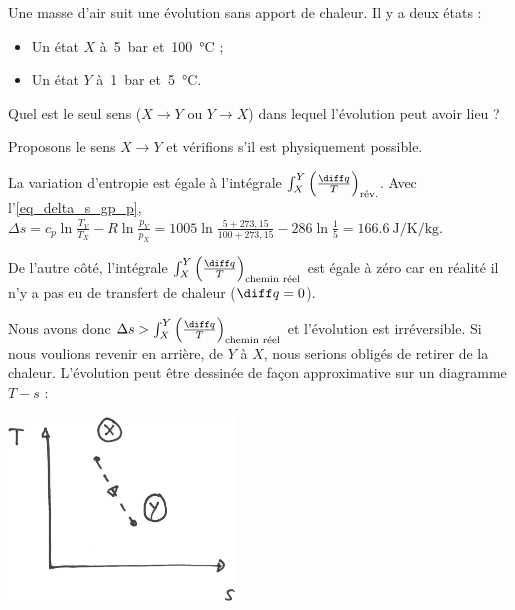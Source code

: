 		\begin{anexample}
			Une masse d’air suit une évolution sans apport de chaleur. Il y a deux états :
				\begin{itemize}
					\item Un état $X$ à~\SI{5}{\bar} et~\SI{100}{\degreeCelsius} ;
					\item Un état $Y$ à~\SI{1}{\bar} et~\SI{5}{\degreeCelsius}.
				\end{itemize}
			Quel est le seul sens ($X \to Y$ ou $Y \to X$) dans lequel l’évolution peut avoir lieu ?
						
				\begin{answer}
					Proposons le sens $X \to Y$ et vérifions s’il est physiquement possible.
					
					La variation d’entropie est égale à l’intégrale $\int_X^Y \left(\frac{\diff q}{T}\right)_\text{rév.}$. Avec l’\cref{eq_delta_s_gp_p}, $\Delta s = c_p \ln \frac{T_Y}{T_X} - R \ln \frac{p_Y}{p_X} = \num{1005} \ln \frac{5+273,15}{100+273,15} - \num{286} \ln\frac{1}{5}=  \SI{+166,6}{\joule\per\kelvin\per\kilogram}$.

					De l’autre côté, l’intégrale $\int_X^Y \left(\frac{\diff q}{T}\right)_\text{chemin réel}$ est égale à zéro car en réalité il n’y a pas eu de transfert de chaleur ($\diff q = 0$).
					
					Nous avons donc $\Delta s > \int_X^Y \left(\frac{\diff q}{T}\right)_\text{chemin réel}$ et l’évolution est irréversible. Si nous voulions revenir en arrière, de $Y$ à $X$, nous serions obligés de retirer de la chaleur.		
					L’évolution peut être dessinée de façon approximative sur un diagramme $T-s$ :\\
						\begin{center}\includegraphics[width=6cm]{images/ts_example_7.png}\end{center}
				\end{answer}
		\end{anexample}

		

